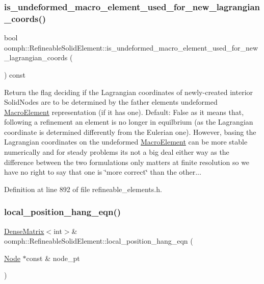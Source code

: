 \subsubsection{\texorpdfstring{is\+\_\+undeformed\+\_\+macro\+\_\+element\+\_\+used\+\_\+for\+\_\+new\+\_\+lagrangian\+\_\+coords()}{is\_undeformed\_macro\_element\_used\_for\_new\_lagrangian\_coords()}}
{\footnotesize\ttfamily bool oomph\+::\+Refineable\+Solid\+Element\+::is\+\_\+undeformed\+\_\+macro\+\_\+element\+\_\+used\+\_\+for\+\_\+new\+\_\+lagrangian\+\_\+coords (\begin{DoxyParamCaption}{ }\end{DoxyParamCaption}) const\hspace{0.3cm}{\ttfamily [inline]}}



Return the flag deciding if the Lagrangian coordinates of newly-\/created interior Solid\+Nodes are to be determined by the father element\textquotesingle{}s undeformed \hyperlink{classoomph_1_1MacroElement}{Macro\+Element} representation (if it has one). Default\+: False as it means that, following a refinement an element is no longer in equilbrium (as the Lagrangian coordinate is determined differently from the Eulerian one). However, basing the Lagrangian coordinates on the undeformed \hyperlink{classoomph_1_1MacroElement}{Macro\+Element} can be more stable numerically and for steady problems it\textquotesingle{}s not a big deal either way as the difference between the two formulations only matters at finite resolution so we have no right to say that one is \char`\"{}more correct\char`\"{} than the other... 



Definition at line 892 of file refineable\+\_\+elements.\+h.

\mbox{\label{classoomph_1_1RefineableSolidElement_ac939940d4412c76913afd16cf752cacf}} 
\subsubsection{\texorpdfstring{local\+\_\+position\+\_\+hang\+\_\+eqn()}{local\_position\_hang\_eqn()}}
{\footnotesize\ttfamily \hyperlink{classoomph_1_1DenseMatrix}{Dense\+Matrix}$<$int$>$\& oomph\+::\+Refineable\+Solid\+Element\+::local\+\_\+position\+\_\+hang\+\_\+eqn (\begin{DoxyParamCaption}\item[{\hyperlink{classoomph_1_1Node}{Node} $\ast$const \&}]{node\+\_\+pt }\end{DoxyParamCaption})\hspace{0.3cm}{\ttfamily [inline]}}



